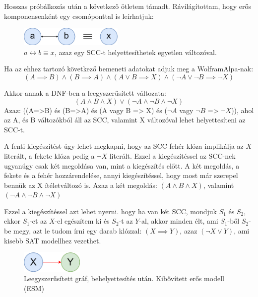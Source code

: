 \documentclass[
]{thesis-ekf}
\theoremstyle{definition}
\theoremstyle{remark}
\begin{document}
	Hosszas próbálkozás után a következő ötletem támadt. Rávilágítottam, hogy erős komponensenként egy csomóponttal is leírhatjuk:
	
	\begin{figure}[ht]
		\centering
		\includegraphics[width=5cm]{images/sajat_pelda}
		\caption{$ a\leftrightarrow b\equiv x$, azaz egy \textsc{SCC}-t helyettesíthetek egyetlen változóval.}
		\label{abra-sajatpelda-ab-x}
	\end{figure}
	
	Ha az ehhez tartozó következő bemeneti adatokat adjuk meg a WolframAlpa-nak:
	\[ (A\implies B)\wedge(B\implies A)\wedge(A\vee B \implies X)\wedge(\neg A\vee\neg B\implies\neg X) \]

	Akkor annak a \textsc{DNF}-ben a leegyszerűsített változata:
	\[ (A\wedge B\wedge X)\vee(\neg A\wedge\neg B\wedge\neg X) \]	
	Azaz: ((A=>B) és (B=>A) és (A vagy B => X) és ($ \neg A $ vagy $ \neg B $ => $ \neg X $)), ahol az A, és B változókból áll az \textsc{SCC}, valamint X változóval lehet helyettesíteni az \textsc{SCC}-t.
	
	A fenti kiegészítést úgy lehet megkapni, hogy az \textsc{SCC} fehér klóza implikálja az $ X $ literált, a fekete klóza pedig a $ \neg X $ literált. Ezzel a kiegészítéssel az \textsc{SCC}-nek ugyanúgy csak két megoldása van, mint a kiegészítés előtt. A két megoldás, a fekete és a fehér hozzárendelése, annyi kiegészítéssel, hogy most már szerepel bennük az X ítéletváltozó is. Azaz a két megoldás: $ (A \wedge B \wedge X) $, valamint $ (\neg A \wedge \neg B \wedge \neg X) $
	
	Ezzel a kiegészítéssel azt lehet nyerni. hogy ha van két \textsc{SCC}, mondjuk $ S_1 $ és $ S_2 $, ekkor $ S_1 $-et az $ X $-el egészítem ki és $ S_2 $-t az $ Y $-al, akkor minden élt, ami $ S_1 $-ből $ S_2 $-be megy, azt le tudom írni egy darab klózzal: $ (X\implies Y) $, azaz $ (\neg X\vee Y) $, ami kisebb \textsc{SAT} modellhez vezethet.
	
	\begin{figure}[ht]
		\centering
		\includegraphics[width=3cm]{images/sajat_pelda_5_9_to_esm}
		\caption{Leegyszerűsített gráf, behelyettesítés után. Kibővített erős modell (\textsc{ESM})}
		\label{abra-sajatpelda-59to-esm}
	\end{figure}
\end{document}
